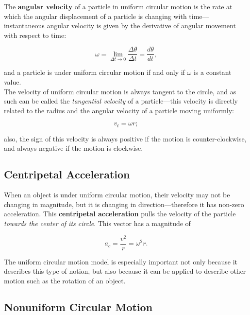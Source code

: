 \documentclass[12pt,letterpaper]{article}
\begin{document}
The \textbf{angular velocity} of a particle in uniform circular motion is the rate at which the angular displacement of a particle is changing with time---instantaneous angular velocity is given by the derivative of angular movement with respect to time:

\begin{center}
	$$\omega = \lim_{\Delta t\to0}\frac{\Delta \theta}{\Delta t} = \frac{d\theta}{dt},$$\linebreak
\end{center}

and a particle is under uniform circular motion if and only if $\omega$ is a constant value. \\

The velocity of uniform circular motion is always tangent to the circle, and as such can be called the \textit{tangential velocity} of a particle---this velocity is directly related to the radius and the angular velocity of a particle moving uniformly:

\begin{center}
	$$v_{t} = \omega r;$$\linebreak
\end{center}

also, the sign of this velocity is always positive if the motion is counter-clockwise, and always negative if the motion is clockwise. 

\subsection[Centripetal Acceleration]{Centripetal Acceleration}

When an object is under uniform circular motion, their velocity may not be changing in magnitude, but it is changing in direction---therefore it has non-zero acceleration. This \textbf{centripetal acceleration} pulls the velocity of the particle \textit{towards the center of its circle}. This vector has a magnitude of 

\begin{center}
	$$a_{c} = \frac{v^{2}}{r} = \omega^{2} r.$$\linebreak
\end{center}

The uniform circular motion model is especially important not only because it describes this type of notion, but also because it can be applied to describe other motion such as the rotation of an object.

\subsection[Nonuniform Circular Motion]{Nonuniform Circular Motion}
\end{document}
